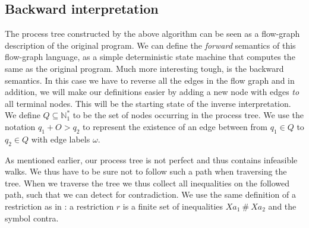 \documentclass[10pt]{../sigplanconf}
\newcommand{\gen}{\ensuremath{~{\leq\kern-6pt \raisebox{1pt}{$\cdot$}}~}}
\begin{document}



\subsection{Backward interpretation}
The process tree constructed by the above algorithm can be seen as a
flow-graph description of the original program. We can define the
\textit{forward} semantics of this flow-graph language, as a simple
deterministic state machine that computes the same as the original
program. Much more interesting tough, is the backward semantics. In
this case we have to reverse all the edges in the flow graph and in
addition, we will make our definitions easier by adding a new node
with edges \textit{to} all terminal nodes. This will be the starting
state of the inverse interpretation. We define $Q \subseteq
\mathbb{N}^{*}_1$ to be the set of nodes occurring in the process
tree. We use the notation $q_1 +O> q_2$ to represent the existence of
an edge between from $q_1 \in Q$ to $q_2 \in Q$ with edge labels
$\omega$.

As mentioned earlier, our process tree is not perfect and thus
contains infeasible walks. We thus have to be sure not to follow such
a path when traversing the tree. When we traverse the tree we thus
collect all inequalities on the followed path, such that we can detect
for contradiction. We use the same definition of a restriction as in
\cite{abramov2000universal}: a restriction $r$ is a finite set of
inequalities $Xa_1\ \#\ Xa_2$ and the symbol \textsf{contra}.
\end{document}
